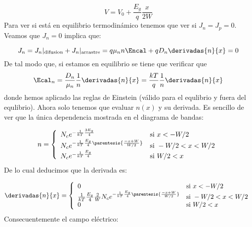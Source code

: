 \begin{enumerate}[label=\alph*)]
		\begin{equation}
			V=V_0 + \frac{E_g}{q} \frac{x}{2W}
		\end{equation}
		Para ver si está en equilibrio termodinámico tenemos que ver si $J_n=J_p=0$. Veamos que $J_n=0$ implica que:

		\begin{equation}
			J_n = J_n |_{\text{difusion}} +J_n |_{\text{arrastre}} = q\mu_n n \Encal + qD_n\derivadas{n}{x} = 0
		\end{equation}
		De tal modo que, si estamos en equilibrio se tiene que verificar que
		\begin{equation}
			\Ecal_n = \frac{D_n}{\mu_n} \frac{1}{n} \derivadas{n}{x} =
			\frac{kT}{q} \frac{1}{n} \derivadas{n}{x}
		\end{equation}
		donde hemos aplicado las reglas de Einstein (válido para el equlibrio y fuera del equlibrio). Ahora solo tenemos que evaluar $n(x)$ y su derivada. Es sencillo de ver que la única dependencia mostrada en el diagrama de bandas:

		\begin{equation}
			n = \left\lbrace
			\begin{array}{ll}
				N_c e^{-\frac{1}{kT}\frac{3E_g}{4}}	& \text{si} \ x<-W/2 \\
				N_c e^{-\frac{1}{kT}\frac{E_g}{4} \parentesis{\frac{-x+W}{W/2}}}	& \text{si} \ -W/2<x<W/2 \\
				N_c e^{-\frac{1}{kT}\frac{E_g}{4}} & \text{si} \ W/2<x
			\end{array} \right.
		\end{equation}
		De lo cual deducimos que la derivada es:

		\begin{equation}
			\derivadas{n}{x} = \left\lbrace
			\begin{array}{ll}
				0	& \text{si} \ x<-W/2 \\
				\frac{1}{kT}\frac{E_g}{4}\frac{2}{W}N_c e^{-\frac{1}{kT}\frac{E_g}{4} \parentesis{\frac{-x+W}{W/2}}}	& \text{si} \ -W/2<x<W/2 \\
				0 & \text{si} \ W/2<x
			\end{array} \right.
		\end{equation}
		Consecuentemente el campo eléctrico:


\end{enumerate}
